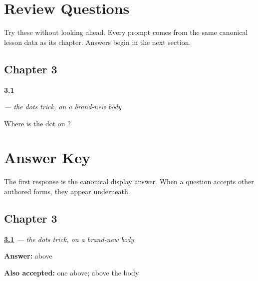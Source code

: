 
\chapter*{Review Questions}

Try these without looking ahead. Every prompt comes from the same canonical lesson data as its chapter. Answers begin in the next section.

\section*{Chapter 3}

\noindent\begin{minipage}[t]{\linewidth}
\raggedright
\hypertarget{review-AR-W07-hook-family-ha-kha-dot-position}{\textbf{3.1}} \emph{   — the dots trick, on a brand-new body}\par
\small Where is the dot on ?
\end{minipage}\par\medskip

\chapter*{Answer Key}

The first response is the canonical display answer. When a question accepts other authored forms, they appear underneath.

\section*{Chapter 3}

\noindent\begin{minipage}[t]{\linewidth}
\raggedright
\hyperlink{review-AR-W07-hook-family-ha-kha-dot-position}{\textbf{3.1}} \emph{   — the dots trick, on a brand-new body}\par
\small \textbf{Answer:} above\par
\footnotesize \textbf{Also accepted:} one above; above the body
\end{minipage}\par\medskip
